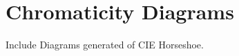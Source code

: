 
\chapter{Chromaticity Diagrams}
\label{appendix:chromaticity-diagrams}

Include Diagrams generated of CIE Horseshoe.
